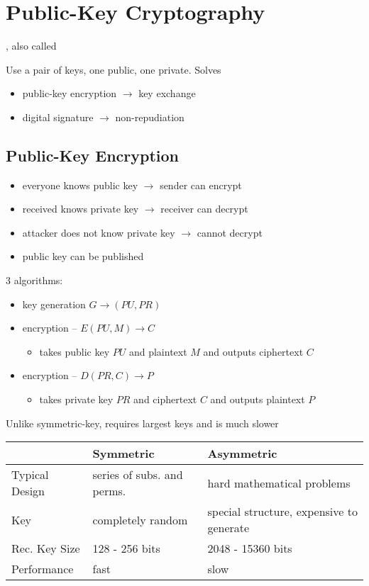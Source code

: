 \documentclass[final]{article}
\begin{document}
\section{Public-Key Cryptography}
, also called 

Use a pair of keys, one public, one private. Solves
\begin{itemize}[nosep]
    \item public-key encryption $\rightarrow$ key exchange
    \item digital signature $\rightarrow$ non-repudiation
\end{itemize}
\subsection{Public-Key Encryption}
\begin{itemize}[nosep]
    \item everyone knows public key $\rightarrow$ sender can encrypt
    \item received knows private key $\rightarrow$ receiver can decrypt
    \item attacker does not know private key $\rightarrow$ cannot decrypt
    \item public key can be published
\end{itemize}
3 algorithms:
\begin{itemize}[nosep]
    \item key generation $G \rightarrow (PU, PR)$
    \item encryption -- $E(PU, M) \rightarrow C$
          \begin{itemize}[nosep]\item takes public key $PU$ and plaintext $M$ and outputs ciphertext $C$\end{itemize}
    \item encryption -- $D(PR, C) \rightarrow P$
          \begin{itemize}[nosep]\item takes private key $PR$ and ciphertext $C$ and outputs plaintext $P$\end{itemize}
\end{itemize}
Unlike symmetric-key, requires largest keys and is much slower

\begin{tabular}{lll}
                   & Symmetric                  & Asymmetric                               \\\toprule
    Typical Design & series of subs. and perms. & hard mathematical problems               \\
    Key            & completely random          & special structure, expensive to generate \\
    Rec. Key Size  & 128 - 256 bits             & 2048 - 15360 bits                        \\
    Performance    & fast                       & slow                                     \\\bottomrule
\end{tabular}
\end{document}
